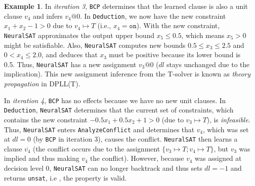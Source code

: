 \documentclass[oneside,11pt,dvipsnames]{book}
\numberwithin{equation}{section}
\theoremstyle{definition}
\newtheorem{example}{Example}[section]
\theoremstyle{remark}
\newcommand{\tvn}[1]{\iftoggle{usecomment}{{\color{red}{[TVN]: #1}}}{}}
\newcommand{\hd}[1]{\iftoggle{usecomment}{{\color{blue}{[HD]: #1}}}{}}
\newcommand{\neuralsat}{\texttt{NeuralSAT}}
\newcommand{\unsat}{\texttt{unsat}}
\begin{document}
\begin{example}
In \emph{iteration 3}, \texttt{BCP} determines that the learned clause is also a unit clause $v_4$ and infers $v_4@0$. In \texttt{Deduction}, we now have the new constraint $x_1 + x_2 - 1 > 0$ due to $v_4 \mapsto T$ (i.e., $x_4=\texttt{on}$).  With the new constraint, \neuralsat{} 
approximates the output upper bound $x_5 \le  0.5$, which means $x_5>0$ might be satisfiable.
Also, \neuralsat{} computes new bounds $0.5 \le x_3 \le 2.5$ and $0 < x_4 \le 2.0$, and deduces that $x_3$ must be positive because its lower bound is 0.5. 
Thus, \neuralsat{} has a new assignment $v_3@0$ ($dl$ stays unchanged due to the implication). 
This new assignment inference from the T-solver is known as \emph{theory propagation} in DPLL(T).

In \emph{iteration 4}, \texttt{BCP} has no effects because we have no new unit clauses.  In \texttt{Deduction}, \neuralsat{} determines that the current set of constraints, which contains the new constraint $-0.5x_1+0.5x_2+1 > 0$ (due to $v_3 \mapsto T$), is \emph{infeasible}. Thus, \neuralsat{} enters \texttt{AnalyzeConflict} and determines that $v_4$, which was set at $dl=0$ (by \texttt{BCP} in iteration 3), causes the conflict. 
\neuralsat{} then learns a clause $\overline{v_4}$ (the conflict occurs due to the assignment $\{v_3 \mapsto T; v_4 \mapsto T\}$, but $v_3$ was implied and thus making $v_4$ the conflict).
However, because $v_4$ was assigned at decision level 0, \neuralsat{} can no longer backtrack and thus sets $dl=-1$ and returns \unsat{}, i.e , the property is valid.





\end{example}
\end{document}
